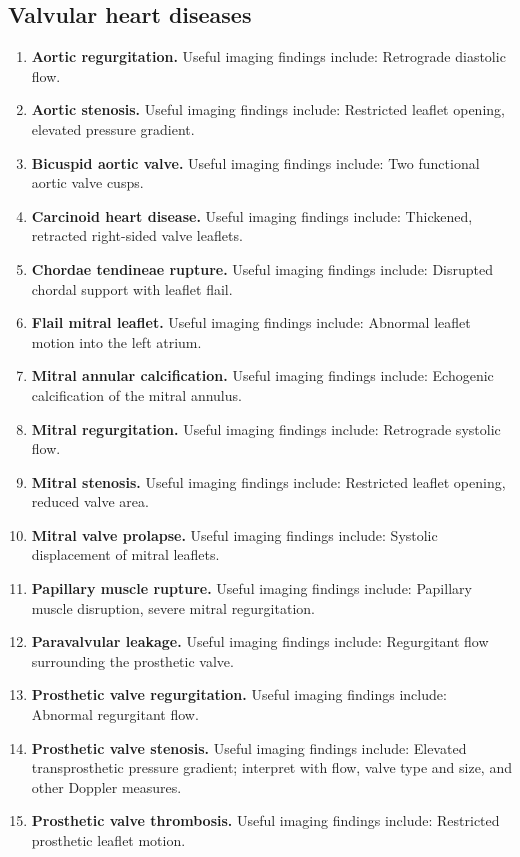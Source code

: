 \subsection{Valvular heart diseases}
\begin{enumerate}[leftmargin=*,itemsep=0.45em,topsep=0.4em]
\item \textbf{Aortic regurgitation.} Useful imaging findings include: Retrograde diastolic flow.
\item \textbf{Aortic stenosis.} Useful imaging findings include: Restricted leaflet opening, elevated pressure gradient.
\item \textbf{Bicuspid aortic valve.} Useful imaging findings include: Two functional aortic valve cusps.
\item \textbf{Carcinoid heart disease.} Useful imaging findings include: Thickened, retracted right-sided valve leaflets.
\item \textbf{Chordae tendineae rupture.} Useful imaging findings include: Disrupted chordal support with leaflet flail.
\item \textbf{Flail mitral leaflet.} Useful imaging findings include: Abnormal leaflet motion into the left atrium.
\item \textbf{Mitral annular calcification.} Useful imaging findings include: Echogenic calcification of the mitral annulus.
\item \textbf{Mitral regurgitation.} Useful imaging findings include: Retrograde systolic flow.
\item \textbf{Mitral stenosis.} Useful imaging findings include: Restricted leaflet opening, reduced valve area.
\item \textbf{Mitral valve prolapse.} Useful imaging findings include: Systolic displacement of mitral leaflets.
\item \textbf{Papillary muscle rupture.} Useful imaging findings include: Papillary muscle disruption, severe mitral regurgitation.
\item \textbf{Paravalvular leakage.} Useful imaging findings include: Regurgitant flow surrounding the prosthetic valve.
\item \textbf{Prosthetic valve regurgitation.} Useful imaging findings include: Abnormal regurgitant flow.
\item \textbf{Prosthetic valve stenosis.} Useful imaging findings include: Elevated transprosthetic pressure gradient; interpret with flow, valve type and size, and other Doppler measures.
\item \textbf{Prosthetic valve thrombosis.} Useful imaging findings include: Restricted prosthetic leaflet motion.

\end{enumerate}
